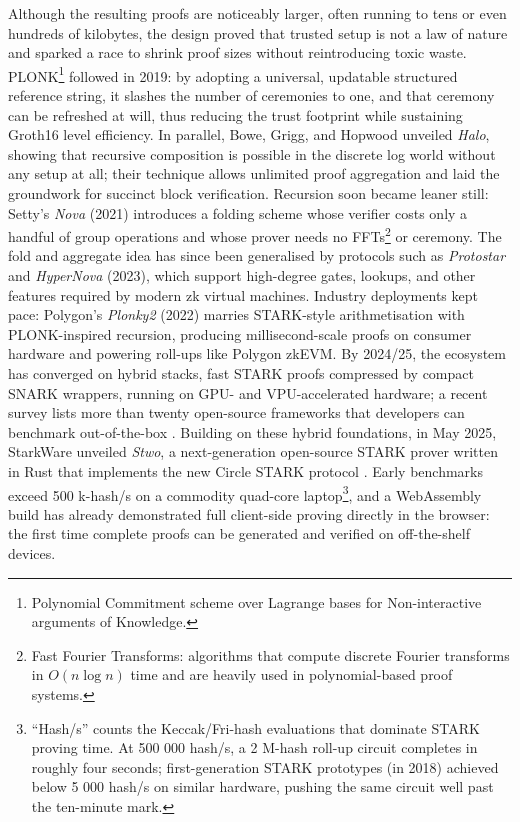 Although the resulting proofs are noticeably larger, often running to tens or even hundreds of kilobytes, the design proved that trusted setup is not a law of nature and sparked a race to shrink proof sizes without reintroducing toxic waste.  PLONK\footnote{Polynomial Commitment scheme over Lagrange bases for Non-interactive arguments of Knowledge.} followed in 2019: by adopting a universal, updatable structured reference string, it slashes the number of ceremonies to one, and that ceremony can be refreshed at will, thus reducing the trust footprint while sustaining Groth16 level efficiency\cite{gabizonPlonk2019}.  In parallel, Bowe, Grigg, and Hopwood unveiled \textit{Halo}, showing that recursive composition is possible in the discrete log world without any setup at all; their technique allows unlimited proof aggregation and laid the groundwork for succinct block verification\cite{boweHalo2019}.  Recursion soon became leaner still: Setty's \textit{Nova} (2021) introduces a folding scheme whose verifier costs only a handful of group operations and whose prover needs no FFTs\footnote{Fast Fourier Transforms: algorithms that compute discrete Fourier transforms in \(O(n\log n)\) time and are heavily used in polynomial-based proof systems.} or ceremony\cite{settyNova2021}.  The fold and aggregate idea has since been generalised by protocols such as \textit{Protostar} and \textit{HyperNova} (2023), which support high-degree gates, lookups, and other features required by modern zk virtual machines\cite{bunzProtostar2023}.  Industry deployments kept pace: Polygon's \textit{Plonky2} (2022) marries STARK-style arithmetisation with PLONK-inspired recursion, producing millisecond-scale proofs on consumer hardware and powering roll-ups like Polygon zkEVM\cite{polygonPlonky2Blog2022}. By 2024/25, the ecosystem has converged on hybrid stacks, fast STARK proofs compressed by compact SNARK wrappers, running on GPU- and VPU-accelerated hardware; a recent survey lists more than twenty open-source frameworks that developers can benchmark out-of-the-box \cite{sheybaniZKPSurvey2025}.  
Building on these hybrid foundations, in May 2025, StarkWare unveiled \textit{Stwo}, a next-generation open-source STARK prover written in Rust that implements the new Circle STARK protocol \cite{circleSTARK}.  
Early benchmarks exceed 500 k-hash/s on a commodity quad-core laptop\footnote{“Hash/s” counts the Keccak/Fri-hash evaluations that dominate STARK proving time. At 500 000 hash/s, a 2 M-hash roll-up circuit completes in roughly four seconds; first-generation STARK prototypes (in 2018) achieved below 5 000 hash/s on similar hardware, pushing the same circuit well past the ten-minute mark.}, and a WebAssembly build has already demonstrated full client-side proving directly in the browser: the first time complete proofs can be generated and verified on off-the-shelf devices.  
